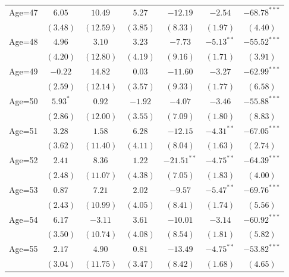 \documentclass[fullpage]{paper}
\begin{document}
\begin{center}
\begin{longtable}{l c c c c c c }
Age=47      & $6.05$        & $10.49$      & $5.27$       & $-12.19$      & $-2.54$       & $-68.78^{***}$ \\
            & $(3.48)$      & $(12.59)$    & $(3.85)$     & $(8.33)$      & $(1.97)$      & $(4.40)$       \\
Age=48      & $4.96$        & $3.10$       & $3.23$       & $-7.73$       & $-5.13^{**}$  & $-55.52^{***}$ \\
            & $(4.20)$      & $(12.80)$    & $(4.19)$     & $(9.16)$      & $(1.71)$      & $(3.91)$       \\
Age=49      & $-0.22$       & $14.82$      & $0.03$       & $-11.60$      & $-3.27$       & $-62.99^{***}$ \\
            & $(2.59)$      & $(12.14)$    & $(3.57)$     & $(9.33)$      & $(1.77)$      & $(6.58)$       \\
Age=50      & $5.93^{*}$    & $0.92$       & $-1.92$      & $-4.07$       & $-3.46$       & $-55.88^{***}$ \\
            & $(2.86)$      & $(12.00)$    & $(3.55)$     & $(7.09)$      & $(1.80)$      & $(8.83)$       \\
Age=51      & $3.28$        & $1.58$       & $6.28$       & $-12.15$      & $-4.31^{**}$  & $-67.05^{***}$ \\
            & $(3.62)$      & $(11.40)$    & $(4.11)$     & $(8.04)$      & $(1.63)$      & $(2.74)$       \\
Age=52      & $2.41$        & $8.36$       & $1.22$       & $-21.51^{**}$ & $-4.75^{**}$  & $-64.39^{***}$ \\
            & $(2.48)$      & $(11.07)$    & $(4.38)$     & $(7.05)$      & $(1.83)$      & $(4.00)$       \\
Age=53      & $0.87$        & $7.21$       & $2.02$       & $-9.57$       & $-5.47^{**}$  & $-69.76^{***}$ \\
            & $(2.43)$      & $(10.99)$    & $(4.05)$     & $(8.41)$      & $(1.74)$      & $(5.56)$       \\
Age=54      & $6.17$        & $-3.11$      & $3.61$       & $-10.01$      & $-3.14$       & $-60.92^{***}$ \\
            & $(3.50)$      & $(10.74)$    & $(4.08)$     & $(8.54)$      & $(1.81)$      & $(5.82)$       \\
Age=55      & $2.17$        & $4.90$       & $0.81$       & $-13.49$      & $-4.75^{**}$  & $-53.82^{***}$ \\
            & $(3.04)$      & $(11.75)$    & $(3.47)$     & $(8.42)$      & $(1.68)$      & $(4.65)$       \\

\end{longtable}
\end{center}
\end{document}
